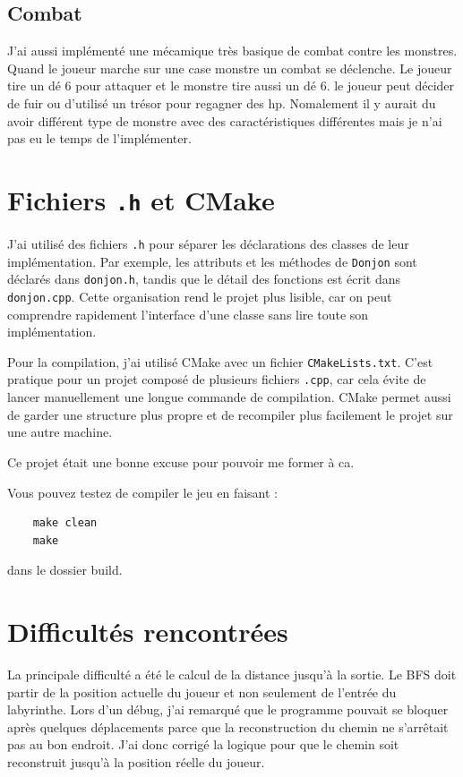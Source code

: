 \documentclass{article}
\begin{document}
\subsection{Combat}
J'ai aussi implémenté une mécamique très basique de combat contre les monstres. Quand le joueur marche sur une case monstre un combat se déclenche. Le joueur tire un dé 6 pour attaquer et le monstre tire aussi un dé 6. le joueur peut décider de fuir ou d'utilisé un trésor pour regagner des hp. Nomalement il y aurait du avoir différent type de monstre avec des caractéristiques différentes mais je n'ai pas eu le temps de l'implémenter.

\section{Fichiers \texttt{.h} et CMake}

J'ai utilisé des fichiers \texttt{.h} pour séparer les déclarations des classes de leur implémentation. Par exemple, les attributs et les méthodes de \texttt{Donjon} sont déclarés dans \texttt{donjon.h}, tandis que le détail des fonctions est écrit dans \texttt{donjon.cpp}. Cette organisation rend le projet plus lisible, car on peut comprendre rapidement l'interface d'une classe sans lire toute son implémentation.

Pour la compilation, j'ai utilisé CMake avec un fichier \texttt{CMakeLists.txt}. C'est pratique pour un projet composé de plusieurs fichiers \texttt{.cpp}, car cela évite de lancer manuellement une longue commande de compilation. CMake permet aussi de garder une structure plus propre et de recompiler plus facilement le projet sur une autre machine.

Ce projet était une bonne excuse pour pouvoir me former à ca.


Vous pouvez testez de compiler le jeu en faisant :
\begin{verbatim}
    make clean
    make
\end{verbatim}
dans le dossier build.

\section{Difficultés rencontrées}

La principale difficulté a été le calcul de la distance jusqu'à la sortie. Le BFS doit partir de la position actuelle du joueur et non seulement de l'entrée du labyrinthe. Lors d'un débug, j'ai remarqué que le programme pouvait se bloquer après quelques déplacements parce que la reconstruction du chemin ne s'arrêtait pas au bon endroit. J'ai donc corrigé la logique pour que le chemin soit reconstruit jusqu'à la position réelle du joueur.
\end{document}
